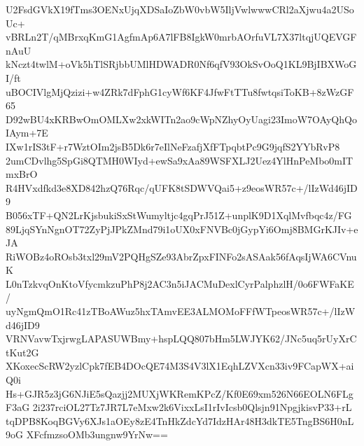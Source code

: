 U2FsdGVkX19fTms3OENxUjqXDSaIoZbW0vbW5IljVwlwwwCRl2aXjwu4a2USoUc+
vBRLn2T/qMBrxqKmG1AgfmAp6A7lFB8IgkW0mrbAOrfuVL7X37ltqjUQEVGFnAuU
kNczt4twlM+oVk5hTlSRjbbUMlHDWADR0Nf6qfV93OkSvOoQ1KL9BjIBXWoGI/ft
uBOCIVlgMjQzizi+w4ZRk7dFphG1cyWf6KF4JfwFtTTu8fwtqsiToKB+8zWzGF65
D92wBU4xKRBwOmOMLXw2xkWITn2ao9cWpNZhyOyUagi23ImoW7OAyQhQoIAym+7E
IXw1rIS3tF+r7WztOIm2jsB5Dk6r7eIlNeFzafjXfFTpqbtPc9G9jqfS2YYbRvP8
2umCDvlhg5SpGi8QTMH0WIyd+ewSa9xAa89WSFXLJ2Uez4YlHnPeMbo0mITmxBrO
R4HVxdfkd3e8XD842hzQ76Rqc/qUFK8tSDWVQai5+z9eosWR57c+/lIzWd46jID9
B056xTF+QN2LrKjsbukiSxStWumyltjc4gqPrJ51Z+unplK9D1XqlMvfbqc4z/FG
89LjqSYnNgnOT72ZyPjJPkZMnd79i1oUX0xFNVBc0jGypYi6Omj8BMGrKJIv+eJA
RiWOBz4oROsb3txl29mV2PQHgSZe93AbrZpxFINFo2sASAak56fAqsIjWA6CVnuK
L0nTzkvqOnKtoVfycmkzuPhP8j2AC3n5iJACMuDexlCyrPalphzlH/0o6FWFaKE/
uyNgmQmO1Rc41zTBoAWuz5hxTAmvEE3ALMOMoFFfWTpeosWR57c+/lIzWd46jID9
VRNVavwTxjrwgLAPASUWBmy+hspLQQ807bHm5LWJYK62/JNc5uq5rUyXrCtKut2G
XKoxecScRW2yzlCpk7fEB4DOcQE74M3S4V3lX1EqhLZVXcn33iv9FCapWX+aiQ0i
Hs+GJR5z3jG6NJiE5sQazjj2MUXjWKRemKPcZ/Kf0E69xm526N66EOLN6FLgF3aG
2i237rciOL27Tz7JR7L7eMxw2k6VixxLsI1rIvIcsb0Qlsjn91NpgjkisvP33+rL
tqDPB8KoqBGVy6XJs1aOEy8zE4TnHkZdcYd7IdzHAr48H3dkTE5TngBS6H0nL9oG
XFcfmzsoOMb3ungnw9YrNw==
